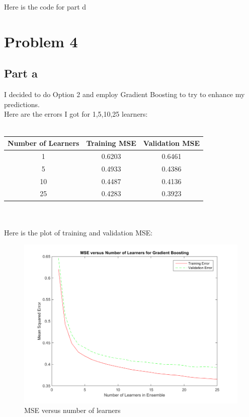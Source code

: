 \documentclass[twoside,11pt]{article}
\theoremstyle{definition}
\begin{document}
Here is the code for part d\\


\newpage

\section*{Problem 4}

\subsection*{Part a}

I decided to do Option 2 and employ Gradient Boosting to try to enhance my predictions. \\
Here are the errors I got for 1,5,10,25 learners: \\
\\
\begin{tabular}{ c | c | c }
  Number of Learners & Training MSE & Validation MSE\\
  \hline                       
  1 & 0.6203 & 0.6461 \\
  5 & 0.4933 & 0.4386\\
  10 & 0.4487 & 0.4136\\
  25 & 0.4283 & 0.3923\\
\end{tabular}
\\
\\
Here is the plot of training and validation MSE:\\
\begin{figure}[h]
\centering
\includegraphics[width=6 in]{prob4PartA.png}
\caption{MSE versus number of learners}
\end{figure}
\end{document}
